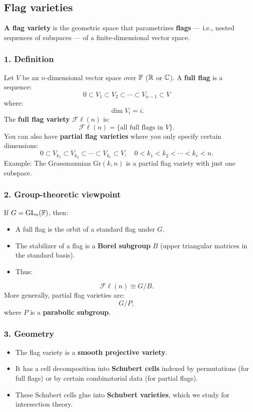 \documentclass{amsart}
\let\originalmathbb\mathbb
\renewcommand{\mathbb}[1]{%
    \ifstrequal{#1}{1}{\mathbbm{#1}}{\originalmathbb{#1}}%
}
\theoremstyle{plain}
\theoremstyle{definition}
\theoremstyle{remark}
\begin{document}
\subsection{Flag varieties}

\textbf{A flag variety} is the geometric space that parametrizes \textbf{flags} — i.e., nested sequences of subspaces — of a finite-dimensional vector space.

\subsubsection{1. Definition}

Let $V$ be an $n$-dimensional vector space over $\mathbb{F}$ ($\mathbb{R}$ or $\mathbb{C}$).
A \textbf{full flag} is a sequence:
\[
0 \subset V_1 \subset V_2 \subset \cdots \subset V_{n-1} \subset V
\]
where:
\[
\dim V_i = i.
\]
The \textbf{full flag variety} $\mathcal{F}\ell(n)$ is:
\[
\mathcal{F}\ell(n) = \{ \text{all full flags in } V \}.
\]
You can also have \textbf{partial flag varieties} where you only specify certain dimensions:
\[
0 \subset V_{k_1} \subset V_{k_2} \subset \cdots \subset V_{k_r} \subset V, \quad 0 < k_1 < k_2 < \cdots < k_r < n.
\]
Example: The Grassmannian $\mathrm{Gr}(k,n)$ is a partial flag variety with just one subspace.

\subsubsection{2. Group-theoretic viewpoint}

If $G = \mathrm{GL}_n(\mathbb{F})$, then:

\begin{itemize}
	\item A full flag is the orbit of a standard flag under $G$.
	\item The stabilizer of a flag is a \textbf{Borel subgroup} $B$ (upper triangular matrices in the standard basis).
	\item Thus:
\end{itemize}
\[
\mathcal{F}\ell(n) \cong G / B.
\]
More generally, partial flag varieties are:
\[
G / P,
\]
where $P$ is a \textbf{parabolic subgroup}.

\subsubsection{3. Geometry}

\begin{itemize}
	\item The flag variety is a \textbf{smooth projective variety}.
	\item It has a cell decomposition into \textbf{Schubert cells} indexed by permutations (for full flags) or by certain combinatorial data (for partial flags).
	\item These Schubert cells glue into \textbf{Schubert varieties}, which we study for intersection theory.
\end{itemize}
\end{document}
